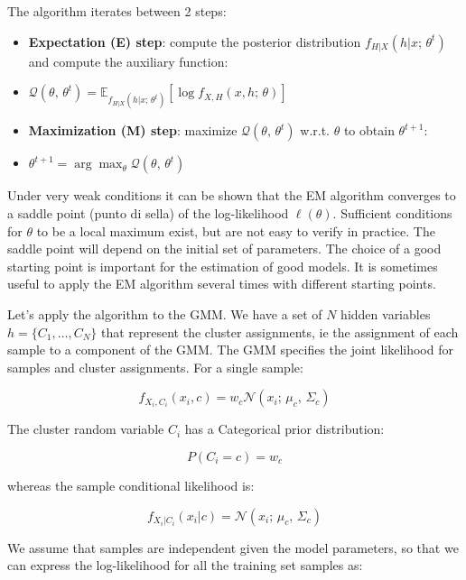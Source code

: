 The algorithm iterates between 2 steps:
\begin{itemize}
	\item \textbf{Expectation (E) step}: compute the posterior distribution $f_{H|X}(h | x;\,\theta^t)$ and compute the auxiliary function:
	\item[] $\mathcal{Q}(\theta,\,\theta^t) = \mathbb{E}_{f_{H|X}(h|x;\,\theta^t)}[\log f_{X,H}(x,h;\,\theta)]$
	\item \textbf{Maximization (M) step}: maximize $\mathcal{Q}(\theta,\,\theta^t)$ w.r.t. $\theta$ to obtain $\theta^{t+1}$:
	\item[] $\theta^{t+1} = \arg\max_\theta \mathcal{Q}(\theta,\,\theta^t)$
\end{itemize}

Under very weak conditions it can be shown that the EM algorithm converges to a saddle point (punto di sella) of the log-likelihood $\ell(\theta)$. Sufficient conditions for $\theta$ to be a local maximum exist, but are not easy to verify in practice. The saddle point will depend on the initial set of parameters. The choice of a good starting point is important for the estimation of good models. It is sometimes useful to apply the EM algorithm several times with different starting points.

Let's apply the algorithm to the GMM. We have a set of $N$ hidden variables $h = \{C_1, \ldots, C_N\}$ that represent the cluster assignments, ie the assignment of each sample to a component of the GMM. The GMM specifies the joint likelihood for samples and cluster assignments. For a single sample:


\begin{equation*}
f_{X_i, C_i}(x_i, c) = w_c \mathcal{N}(x_i;\, \mu_c,\, \Sigma_c)
\end{equation*}

The cluster random variable $C_i$ has a Categorical prior distribution:


\begin{equation*}
P(C_i = c) = w_c
\end{equation*}

whereas the sample conditional likelihood is:


\begin{equation*}
f_{X_i|C_i}(x_i|c) = \mathcal{N}(x_i;\, \mu_c,\, \Sigma_c)
\end{equation*}

We assume that samples are independent given the model parameters, so that we can express the log-likelihood for all the training set samples as:


